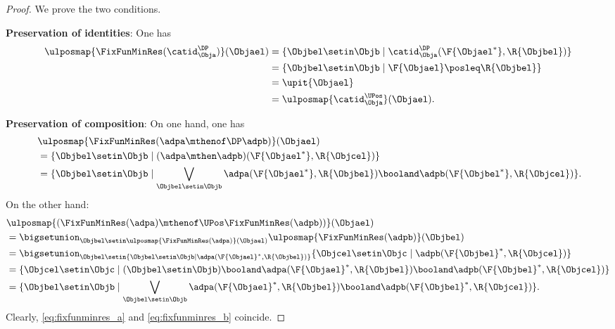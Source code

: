 \begin{proof}
    We prove the two conditions.

    \textbf{Preservation of identities}:
    One has
    \begin{equation*}
        \begin{aligned}
            \ulposmap{\FixFunMinRes(\catid_{\Obja}^{\DP})}(\Objael) & =\{ \Objbel\setin \Objb\mid \catid_{\Obja}^{\DP}(\F{\Objael^*},\R{\Objbel})\} \\
                                                                    & =\{ \Objbel \setin \Objb\mid \F{\Objael}\posleq\R{\Objbel}\} \\
                                                                    & =\upit \{ \Objael\} \\
                                                                    & =\ulposmap{\catid_{\Obja}^{\UPos}}(\Objael).
        \end{aligned}
    \end{equation*}

    \textbf{Preservation of composition}:
    On one hand, one has
    \begin{equation}
        \label{eq:fixfunminres_a}
        \begin{aligned}
            ~ & \ulposmap{\FixFunMinRes(\adpa\mthenof\DP \adpb)}(\Objael) \\
              & =\{ \Objbel\setin \Objb\mid (\adpa\mthen \adpb)(\F{\Objael^*},\R{\Objcel})\} \\
              & =\{ \Objbel\setin \Objb\mid \bigvee_{\Objbel \setin \Objb}\adpa(\F{\Objael^*},\R{\Objbel})\booland \adpb(\F{\Objbel^*},\R{\Objcel})\}.
        \end{aligned}
    \end{equation}
    On the other hand:
    \begin{equation}
        \label{eq:fixfunminres_b}
        \begin{aligned}
             & \ulposmap{(\FixFunMinRes(\adpa)\mthenof\UPos \FixFunMinRes(\adpb))}(\Objael) \\
             & =\bigsetunion_{\Objbel \setin \ulposmap{\FixFunMinRes(\adpa)}(\Objael)}\ulposmap{\FixFunMinRes(\adpb)}(\Objbel) \\
             & =\bigsetunion_{\Objbel \setin \{ \Objbel \setin \Objb \mid \adpa(\F{\Objael}^*,\R{\Objbel})\}} \{\Objcel \setin \Objc \mid \adpb(\F{\Objbel}^*,\R{\Objcel})\} \\
             & =\{\Objcel\setin \Objc \mid (\Objbel \setin \Objb)\booland \adpa(\F{\Objael}^*,\R{\Objbel})\booland \adpb(\F{\Objbel}^*,\R{\Objcel})\} \\
             & =\{ \Objbel\setin \Objb\mid \bigvee_{\Objbel \setin \Objb}\adpa(\F{\Objael}^*,\R{\Objbel})\booland \adpb(\F{\Objbel}^*,\R{\Objcel})\}.
        \end{aligned}
    \end{equation}
    Clearly, \cref{eq:fixfunminres_a} and \cref{eq:fixfunminres_b} coincide.
\end{proof}


